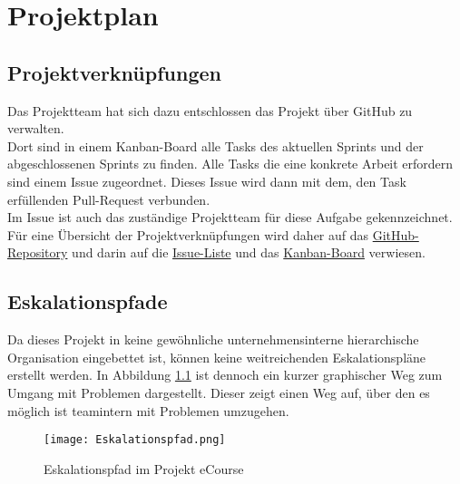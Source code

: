 \chapter{Projektplan}
\section{Projektverknüpfungen}
Das Projektteam hat sich dazu entschlossen das Projekt über GitHub zu verwalten. \\
Dort sind in einem Kanban-Board alle Tasks des aktuellen Sprints und der abgeschlossenen Sprints zu finden. Alle Tasks die eine konkrete Arbeit erfordern sind einem Issue zugeordnet. Dieses Issue wird dann mit dem, den Task erfüllenden Pull-Request verbunden. \\
Im Issue ist auch das zuständige Projektteam für diese Aufgabe gekennzeichnet.\\
Für eine Übersicht der Projektverknüpfungen wird daher auf das \href{https://github.com/LucRome/SWE_Semester4/}{GitHub-Repository} und darin auf die \href{https://github.com/LucRome/SWE_Semester4/issues}{Issue-Liste} und das \href{https://github.com/LucRome/SWE_Semester4/projects/1}{Kanban-Board} verwiesen.
\section{Eskalationspfade}
Da dieses Projekt in keine gewöhnliche unternehmensinterne hierarchische Organisation eingebettet ist, können keine weitreichenden Eskalationspläne erstellt werden. In Abbildung \ref{fib:Eskalationspfad} ist dennoch ein kurzer graphischer Weg zum Umgang mit Problemen dargestellt. Dieser zeigt einen Weg auf, über den es möglich ist teamintern mit Problemen umzugehen.\\

\begin{figure}[h]
\centering
\texttt{[image: Eskalationspfad.png]}
\caption{Eskalationspfad im Projekt eCourse}
\label{fib:Eskalationspfad}
\end{figure}

